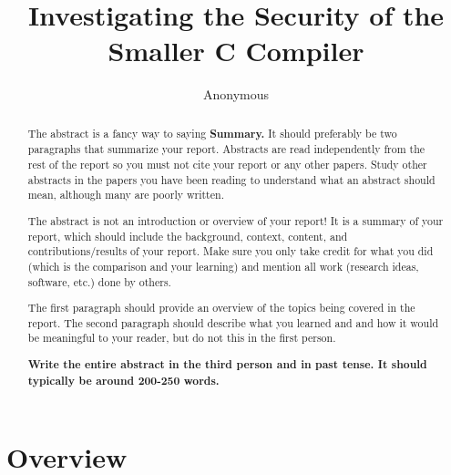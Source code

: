 \documentclass[sigconf, anonymous]{acmart}
\begin{document}
\title{Investigating the Security of the Smaller C Compiler}

\author{Anonymous}

\begin{abstract}
  The abstract is a fancy way to saying {\bf Summary.} It should
  preferably be two paragraphs that summarize your report. Abstracts
  are read independently from the rest of the report so you must not
  cite your report or any other papers. Study other abstracts in the
  papers you have been reading to understand what an abstract should
  mean, although many are poorly written.

  The abstract is not an introduction or overview of your report! It is
  a summary of your report, which should include the background,
  context, content, and contributions/results of your report. Make
  sure you only take credit for what you did (which is the comparison
  and your learning) and mention all work (research ideas, software,
  etc.) done by others.

  The first paragraph should provide an overview of the topics being
  covered in the report. The second paragraph should describe what you
  learned and and how it would be meaningful to your reader, but do
  not this in the first person.
  
  {\bf Write the entire abstract in the third person and in past
    tense. It should typically be around 200-250 words.}
\end{abstract}


\maketitle


\section{Overview}
\label{motivation}
\end{document}
